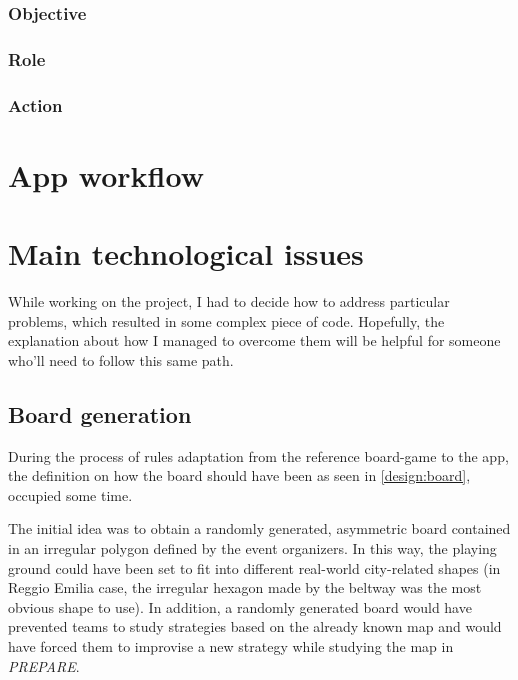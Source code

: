 			\subsubsection{Objective}
			
			\subsubsection{Role}
			
			\subsubsection{Action}
			
	\section{App workflow}
	
	
	\section{Main technological issues}
		
		While working on the project, I had to decide how to address particular problems, which resulted in some complex piece of code.
		Hopefully, the explanation about how I managed to overcome them will be helpful for someone who'll need to follow this same path.
		
		\subsection{Board generation}\label{focus:board}
		
			During the process of rules adaptation from the reference board-game to the app, the definition on how the board should have been as seen in \autoref{design:board}, occupied some time.
			
			The initial idea was to obtain a randomly generated, asymmetric board contained in an irregular polygon defined by the event organizers.
			In this way, the playing ground could have been set to fit into different real-world city-related shapes (in Reggio Emilia case, the irregular hexagon made by the beltway was the most obvious shape to use).
			In addition, a randomly generated board would have prevented teams to study strategies based on the already known map and would have forced them to improvise a new strategy while studying the map in \emph{PREPARE}.
			
